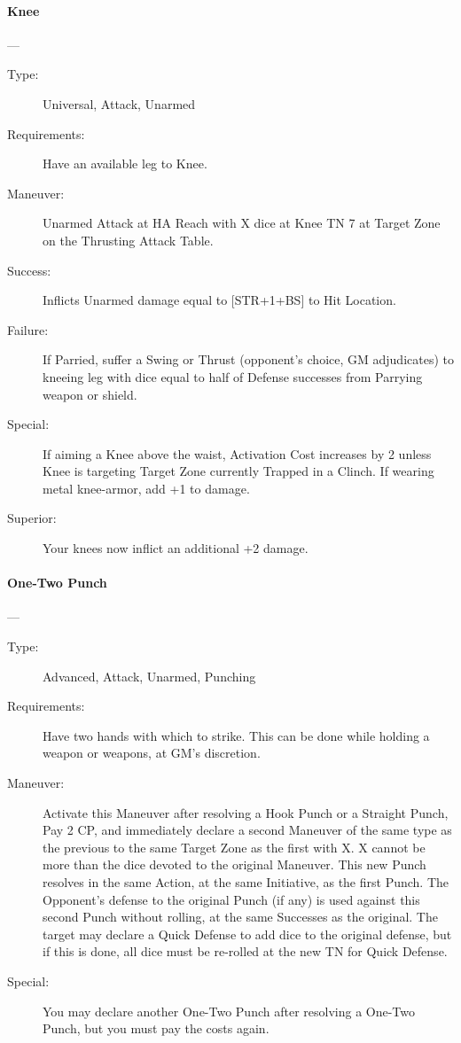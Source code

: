 \documentclass[oneside,11pt,english]{book}
\begin{document}
\paragraph{\large\label{man:Knee}Knee}---\quad{\large[X]}
\vspace{-10pt}\begin{description} 
\item [Type:] Universal, Attack, Unarmed 
\item [Requirements:] Have an available leg to Knee. 
\item [Maneuver:] Unarmed Attack at HA Reach with X dice at Knee TN 7 at Target Zone on the Thrusting 
  Attack Table. 
\item [Success:] Inflicts Unarmed damage equal to [STR+1+BS] to Hit Location. 
\item [Failure:] If Parried, suffer a Swing or Thrust (opponent’s choice, GM adjudicates) to kneeing leg with 
  dice equal to half of Defense successes from Parrying weapon or shield. 
\item [Special:] If aiming a Knee above the waist, Activation Cost increases by 2 unless Knee is targeting Target 
  Zone currently Trapped in a Clinch. If wearing metal knee-armor, add +1 to damage. 
\item [Superior:] Your knees now inflict an additional +2 damage. 
\end{description}

\paragraph{\large\label{man:One-Two Punch}One-Two Punch}---\quad{\large[X+2]}
\vspace{-10pt}\begin{description}
\item [Type:] Advanced, Attack, Unarmed, Punching 
\item [Requirements:] Have two hands with which to strike. This can be done while holding a weapon or 
  weapons, at GM’s discretion. 
\item [Maneuver:] Activate this Maneuver after resolving a Hook Punch or a Straight Punch, Pay 2 CP, and 
  immediately declare a second Maneuver of the same type as the previous to the same Target Zone as the 
  first with X. X cannot be more than the dice devoted to the original Maneuver. This new Punch resolves 
  in the same Action, at the same Initiative, as the first Punch. The Opponent’s defense to the original 
  Punch (if any) is used against this second Punch without rolling, at the same Successes as the original. 
  The target may declare a Quick Defense to add dice to the original defense, but if this is done, all dice 
  must be re-rolled at the new TN for Quick Defense. 
\item [Special:] You may declare another One-Two Punch after resolving a One-Two Punch, but you must pay 
  the costs again. 
\end{description}
\end{document}
